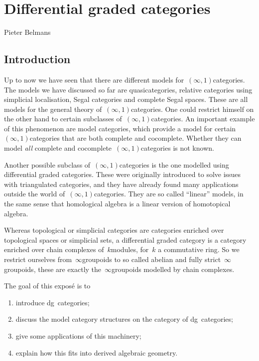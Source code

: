 \chapter{Differential graded categories}
\begin{flushright}
  Pieter Belmans
\end{flushright}

\section{Introduction}
Up to now we have seen that there are different models for~$(\infty,1)$\dash categories. The models we have discussed so far are quasicategories, relative categories using simplicial localisation, Segal categories and complete Segal spaces. These are all models for the general theory of~$(\infty,1)$\dash categories. One could restrict himself on the other hand to certain subclasses of~$(\infty,1)$\dash categories. An important example of this phenomenon are model categories, which provide a model for certain~$(\infty,1)$\dash categories that are both complete and cocomplete. Whether they can model \emph{all} complete and cocomplete~$(\infty,1)$\dash categories is not known.

Another possible subclass of~$(\infty,1)$\dash categories is the one modelled using differential graded categories. These were originally introduced to solve issues with triangulated categories, and they have already found many applications outside the world of~$(\infty,1)$\dash categories. They are so called ``linear'' models, in the same sense that homological algebra is a linear version of homotopical algebra.

Whereas topological or simplicial categories are categories enriched over topological spaces or simplicial sets, a differential graded category is a category enriched over chain complexes of~$k$\dash modules, for~$k$ a commutative ring. So we restrict ourselves from~$\infty$\dash groupoids to so called abelian and fully strict~$\infty$\dash groupoids, these are exactly the~$\infty$\dash groupoids modelled by chain complexes.

The goal of this expos\'e is to
\begin{enumerate}
  \item introduce dg~categories;
  \item discuss the model category structures on the category of dg~categories;
  \item give some applications of this machinery;
  \item explain how this fits into derived algebraic geometry.
\end{enumerate}

